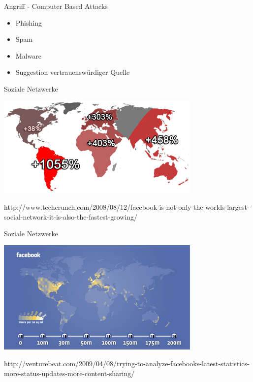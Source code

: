 \documentclass[11pt]{beamer}
\begin{document}
\begin{frame}{Angriff - Computer Based Attacks}
  \begin{itemize}
    \item Phishing
    \item Spam
    \item Malware
    \item Suggestion vertrauenswürdiger Quelle
  \end{itemize}
\end{frame}

\begin{frame}[t]{Soziale Netzwerke}
  \begin{center}
    \includegraphics[width=0.75\textwidth]{growth}

    {\tiny
    http://www.techcrunch.com/2008/08/12/facebook-is-not-only-the-worlds-largest-social-network-it-is-also-the-fastest-growing/
    }
  \end{center}
\end{frame}

\begin{frame}[t]{Soziale Netzwerke}
  \begin{center}
    \includegraphics[width=0.75\textwidth]{fbmap}

    {\tiny
    http://venturebeat.com/2009/04/08/trying-to-analyze-facebooks-latest-statistics-more-status-updates-more-content-sharing/
    }
  \end{center}
\end{frame}
\end{document}
